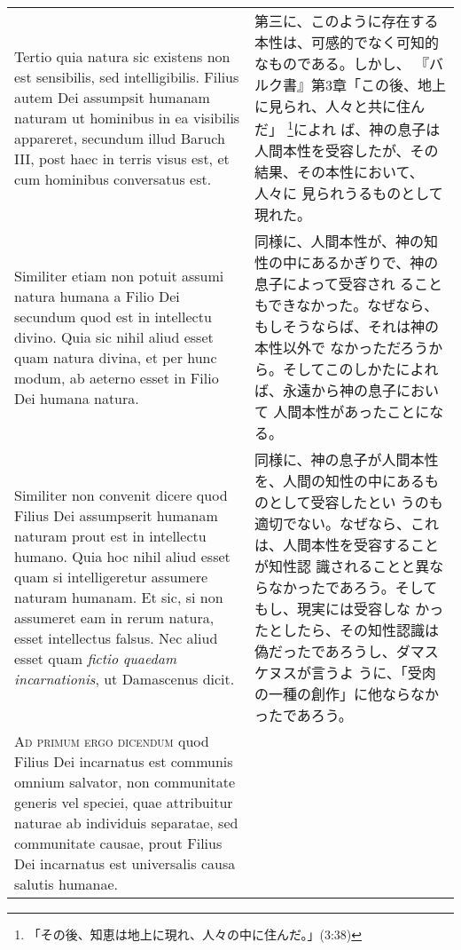 \documentclass[10pt]{jsarticle} %
\begin{document}
\begin{longtable}{p{21em}p{21em}}
\\

Tertio quia natura sic existens non
est sensibilis, sed intelligibilis. Filius autem Dei assumpsit humanam
naturam ut hominibus in ea visibilis appareret, secundum illud Baruch
III, post haec in terris visus est, et cum hominibus conversatus
est. 

&

第三に、このように存在する本性は、可感的でなく可知的なものである。しかし、
『バルク書』第3章「この後、地上に見られ、人々と共に住んだ」
 \footnote{「その後、知恵は地上に現れ、人々の中に住んだ。」(3:38)}によれ
 ば、神の息子は人間本性を受容したが、その結果、その本性において、人々に
 見られうるものとして現れた。

\\

Similiter etiam non potuit assumi natura humana a Filio Dei
secundum quod est in intellectu divino. Quia sic nihil aliud esset quam
natura divina, et per hunc modum, ab aeterno esset in Filio Dei humana
natura. 


&

同様に、人間本性が、神の知性の中にあるかぎりで、神の息子によって受容され
 ることもできなかった。なぜなら、もしそうならば、それは神の本性以外で
 なかっただろうから。そしてこのしかたによれば、永遠から神の息子において
 人間本性があったことになる。


\\

Similiter non convenit dicere quod Filius Dei assumpserit
humanam naturam prout est in intellectu humano. Quia hoc nihil aliud
esset quam si intelligeretur assumere naturam humanam. Et sic, si non
assumeret eam in rerum natura, esset intellectus falsus. Nec aliud esset
quam {\itshape fictio quaedam incarnationis}, ut Damascenus dicit.


&

同様に、神の息子が人間本性を、人間の知性の中にあるものとして受容したとい
 うのも適切でない。なぜなら、これは、人間本性を受容することが知性認
 識されることと異ならなかったであろう。そしてもし、現実には受容しな
 かったとしたら、その知性認識は偽だったであろうし、ダマスケヌスが言うよ
 うに、「受肉の一種の創作」に他ならなかったであろう。


\\



{\scshape Ad primum ergo dicendum} quod Filius Dei incarnatus est communis omnium
salvator, non communitate generis vel speciei, quae attribuitur naturae
ab individuis separatae, sed communitate causae, prout Filius Dei
incarnatus est universalis causa salutis humanae.



\end{longtable}
\end{document}
